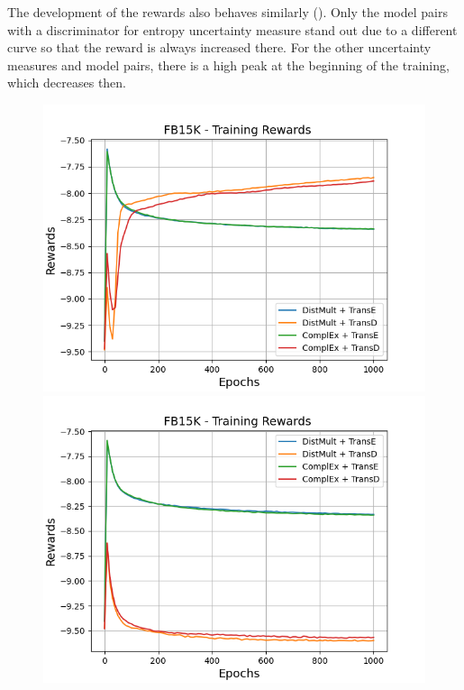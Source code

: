 The development of the rewards also behaves similarly ().
Only the model pairs with a \transd discriminator for entropy uncertainty measure stand out due to a different curve so that the reward is always increased there.
For the other uncertainty measures and model pairs, there is a high peak at the beginning of the training, which decreases then.
\begin{figure}[H]
    \centering
    \begin{minipage}{.5\textwidth}
      \centering
      \includegraphics[width=0.9\linewidth]{figures/results/gan_train/not_pretrained/uncertainty/max_distribution/entropy/fb15k/1k_epochs/uncertainty_fb15k_rew.png}
    \end{minipage}%
    \begin{minipage}{.5\textwidth}
      \centering
      \includegraphics[width=0.9\linewidth]{figures/results/gan_train/not_pretrained/uncertainty/max_distribution/least_confidence/fb15k/uncertainty_fb15k_rew.png}

\end{minipage}
\end{figure}
